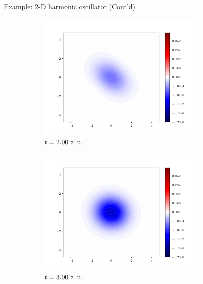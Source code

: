 \documentclass[12pt]{beamer}
\begin{document}
    \begin{frame}{Example: 2-D harmonic oscillator (Cont'd)}
        \begin{figure}
            \begin{subfigure}[b]{0.4\textwidth}
                \centering
                \includegraphics[width=0.9\textwidth]{functions-00002000.pdf}
                \caption*{$t = 2.00~\text{a.\,u.}$}
            \end{subfigure}
            \begin{subfigure}[b]{0.4\textwidth}
                \centering
                \includegraphics[width=0.9\textwidth]{functions-00002999.pdf}
                \caption*{$t = 3.00~\text{a.\,u.}$}
            \end{subfigure}
            \begin{subfigure}[b]{0.4\textwidth}
                \centering

\end{subfigure}
\end{figure}
\end{frame}
\end{document}
